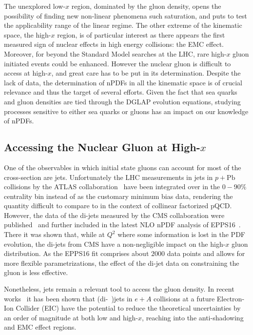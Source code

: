The unexplored low-$x$ region, dominated by the gluon density, opens the possibility of finding new non-linear phenomena such saturation, and puts to test the applicability range of the linear regime. The other extreme of the kinematic space, the high-$x$ region, is of particular interest as there appears the first measured sign of nuclear effects in high energy collisions: the EMC effect. Moreover, for beyond the Standard Model searches at the LHC, rare high-$x$ gluon initiated events could be enhanced. However the nuclear gluon is difficult to access at high-$x$, and great care has to be put in its determination. Despite the lack of data, the determination of nPDFs in all the kinematic space is of crucial relevance and thus the target of several efforts. Given the fact that sea quarks and gluon densities are tied through the DGLAP evolution equations, studying processes sensitive to either sea quarks or gluons has an impact on our knowledge of nPDFs.    

\subsection{Accessing the Nuclear Gluon at High-$x$}

One of the observables in which initial state gluons can account for most of the cross-section are jets. Unfortunately the LHC measurements in jets in $p+\mathrm{Pb}$ collisions by the ATLAS collaboration~\cite{ATLAS:2014cpa} have been integrated over in the $0-90\%$ centrality bin instead of as the customary minimum bias data, rendering the quantity difficult to compare to in the context of collinear factorized pQCD. However, the data of the di-jets measured by the CMS collaboration were published~\cite{Chatrchyan:2014hqa} and further included in the latest NLO nPDF analysis of EPPS16~\cite{Eskola:2016oht}. There it was shown that, while at $Q^{2}$ where some information is lost in the PDF evolution, the di-jets from CMS have a non-negligible impact on the high-$x$ gluon distribution. As the EPPS16 fit comprises about $2000$ data points and allows for more flexible parametrizations, the effect of the di-jet data on constraining the gluon is less effective. %

Nonetheless, jets remain a relevant tool to access the gluon density. In recent works~\cite{PhysRevD.95.094013, PhysRevD.97.114013} it has been shown that (di-~)jets in $e+A$ collisions at a future Electron-Ion Collider (EIC) have the potential to reduce the theoretical uncertainties by an order of magnitude at both low and high-$x$, reaching into the anti-shadowing and EMC effect regions.


